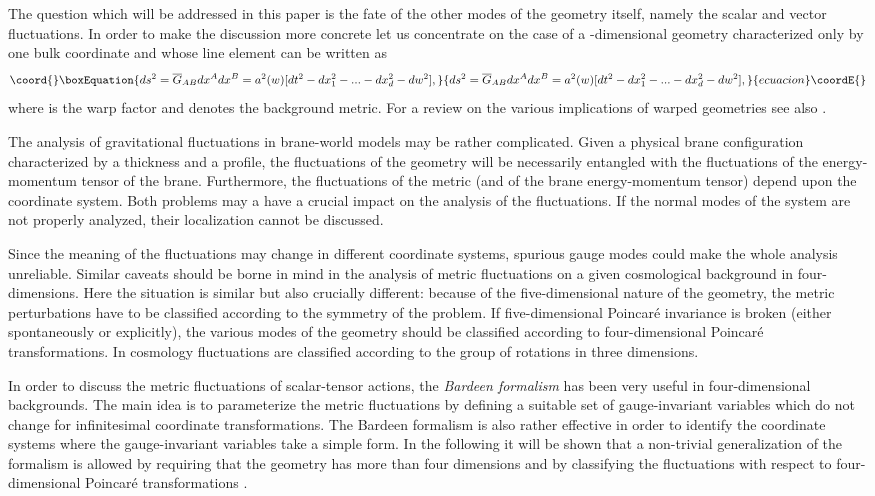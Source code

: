 \documentclass[a4paper,12pt]{article}
\begin{document}
The question which will be addressed in this paper
 is the fate of the other modes of the geometry 
itself, namely the scalar and vector fluctuations. In order 
to make the discussion more concrete let us concentrate on the case 
of a \coordHE{}-dimensional geometry characterized only 
by one bulk coordinate \coordHE{} and whose line element can be written as 
\begin{equation}\coord{}\boxEquation{
ds^2 = \overline{G}_{A B} dx^A dx^B =
 a^2(w)[ dt^2 - d x_{1}^2 -...- d x_{d}^2 - dw^2],
\label{me}
}{
ds^2 = \overline{G}_{A B} dx^A dx^B =
 a^2(w)[ dt^2 - d x_{1}^2 -...- d x_{d}^2 - dw^2],
}{ecuacion}\coordE{}\end{equation}
where \coordHE{} is the warp factor and \coordHE{} denotes the 
background metric. For a review on the 
various implications of warped  geometries see also \cite{rub}.

The analysis of gravitational fluctuations in brane-world
models may be rather complicated. Given a physical 
brane configuration characterized by a thickness and a 
profile, the fluctuations of the geometry will be
necessarily entangled with the fluctuations of the 
energy-momentum tensor of the brane. Furthermore, the 
fluctuations of the metric (and of the brane energy-momentum tensor) 
depend upon the coordinate system. Both problems 
may a have a crucial impact on the analysis of the fluctuations. 
If 
the normal modes of the system are not properly analyzed, their localization 
cannot be discussed. 

Since the meaning of the 
fluctuations may change  in different coordinate 
systems, spurious gauge modes could make the whole 
analysis unreliable. 
Similar caveats should be borne in mind in the analysis of metric 
fluctuations on a given cosmological background in 
four-dimensions. Here the situation is similar but also 
crucially different: because of the five-dimensional 
nature of the geometry, the metric perturbations have to be 
classified according to the symmetry of the problem. If 
five-dimensional Poincar\'e invariance is broken (either 
spontaneously or explicitly), the various 
modes of the geometry should be classified according to four-dimensional 
Poincar\'e transformations. In cosmology 
fluctuations are classified according to the group of rotations 
in three dimensions.

In order to discuss the metric fluctuations of scalar-tensor 
actions, the {\em Bardeen formalism} \cite{bar} has been very useful in 
four-dimensional backgrounds. The main idea is to parameterize 
the metric fluctuations by defining a suitable set of gauge-invariant 
variables which do not change for infinitesimal coordinate 
transformations. The Bardeen formalism is also rather effective in order 
to identify the coordinate systems where the gauge-invariant 
variables take a simple form.  In the following it will be shown that 
a non-trivial generalization of the formalism 
is allowed by requiring that the geometry has more than four 
 dimensions and by classifying the fluctuations with respect 
to four-dimensional  Poincar\'e transformations \cite{n1}.
\end{document}
